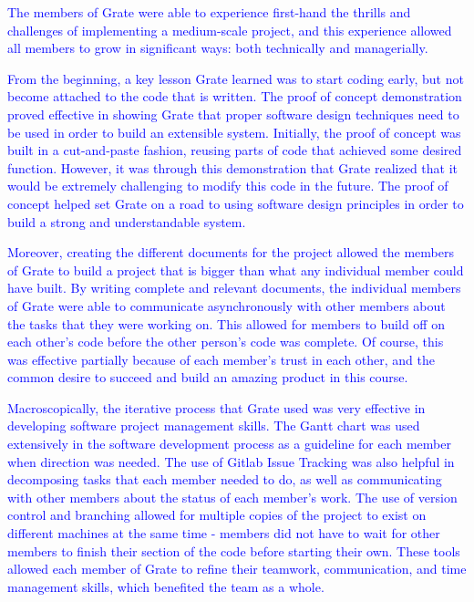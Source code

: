 \documentclass{article}
\begin{document}
\textcolor{blue}{The members of Grate were able to experience first-hand the thrills and 
challenges of implementing a medium-scale project, and this experience allowed 
all members to grow in significant ways: both technically and managerially. }

\textcolor{blue}{From the beginning, a key lesson Grate learned was to start coding early, but 
not become attached to the code that is written. The proof of concept 
demonstration proved effective in showing Grate that proper software design 
techniques need to be used in order to build an extensible system. Initially, 
the proof of concept was built in a cut-and-paste fashion, reusing parts of code 
that achieved some desired function. However, it was through this demonstration 
that Grate realized that it would be extremely challenging to modify this code 
in the future. The proof of concept helped set Grate on a road to using software 
design principles in order to build a strong and understandable system.}

\textcolor{blue}{Moreover, creating the different documents for the project allowed the members 
of Grate to build a project that is bigger than what any individual member could 
have built. By writing complete and relevant documents, the individual members 
of Grate were able to  communicate asynchronously with other members about the 
tasks that they were working on. This allowed for members to build off on each 
other's code before the other person's code was complete. Of course, this was 
effective partially because of each member's trust in each other, and the common 
desire to succeed and build an amazing product in this course.}

\textcolor{blue}{Macroscopically, the iterative process that Grate used was very effective in 
developing software project management skills. The Gantt chart was used 
extensively in the software development process as a guideline for each member 
when direction was needed. The use of Gitlab Issue Tracking was also helpful in 
decomposing tasks that each member needed to do, as well as communicating with 
other members about the status of each member's work. The use of version control 
and branching allowed for multiple copies of the project to exist on different 
machines at the same time - members did not have to wait for other members to 
finish their section of the code before starting their own. These tools allowed 
each member of Grate to refine their teamwork, communication, and time 
management skills, which benefited the team as a whole.}
\end{document}
